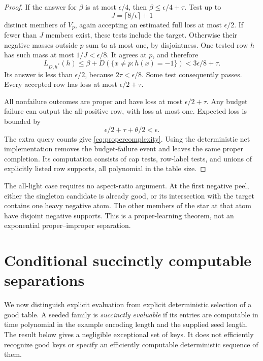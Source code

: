 \documentclass[11pt]{article}
\newcommand{\1}{\mathbf 1}
\begin{document}
\begin{proof}
If the answer for $\beta$ is at most $\epsilon/4$, then $\beta\le\epsilon/4+\tau$. Test up to
\[
 J=\lceil8/\epsilon\rceil+1
\]
distinct members of $V_p$, again accepting an estimated full loss at most $\epsilon/2$. If fewer than $J$ members exist, these tests include the target. Otherwise their negative masses outside $p$ sum to at most one, by disjointness. One tested row $h$ has such mass at most $1/J<\epsilon/8$. It agrees at $p$, and therefore
\[
 L_{D,h^*}(h)\le\beta+D(\{x\ne p:h(x)=-1\})
 <3\epsilon/8+\tau.
\]
Its answer is less than $\epsilon/2$, because $2\tau<\epsilon/8$. Some test consequently passes. Every accepted row has loss at most $\epsilon/2+\tau$.

All nonfailure outcomes are proper and have loss at most $\epsilon/2+\tau$. Any budget failure can output the all-positive row, with loss at most one. Expected loss is bounded by
\[
 \epsilon/2+\tau+\theta/2<\epsilon.
\]
The extra query counts give \eqref{eq:propercomplexity}. Using the deterministic net implementation removes the budget-failure event and leaves the same proper completion. Its computation consists of cap tests, row-label tests, and unions of explicitly listed row supports, all polynomial in the table size.
\end{proof}

The all-light case requires no aspect-ratio argument. At the first negative peel, either the singleton candidate is already good, or its intersection with the target contains one heavy negative atom. The other members of the star at that atom have disjoint negative supports. This is a proper-learning theorem, not an exponential proper--improper separation.



\section{Conditional succinctly computable separations}\label{sec:prf}
We now distinguish explicit evaluation from explicit deterministic selection of a good table. A seeded family is \emph{succinctly evaluable} if its entries are computable in time polynomial in the example encoding length and the supplied seed length. The result below gives a negligible exceptional set of keys. It does not efficiently recognize good keys or specify an efficiently computable deterministic sequence of them.
\end{document}
